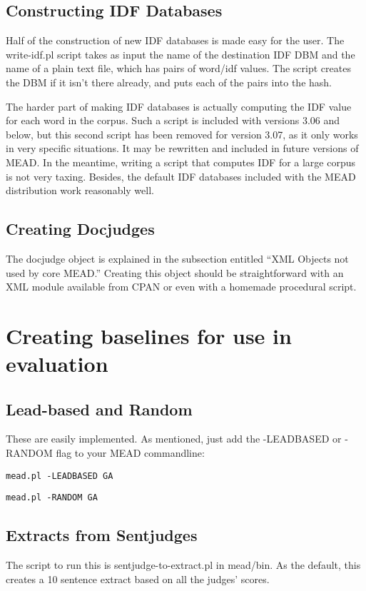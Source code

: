 \documentclass[10pt]{article}
\begin{document}
\subsection{Constructing IDF Databases}

Half of the construction of new IDF databases is made 
easy for the user.  The write-idf.pl script takes
as input the name of the destination IDF DBM and 
the name of a plain text file, which has pairs
of word/idf values.   The script creates the DBM
if it isn't there already, and puts each of the 
pairs into the hash.

The harder part of making IDF databases is actually
computing the IDF value for each word in the corpus.
Such a script is included with versions 3.06 and 
below, but this second script has been removed for
version 3.07, as it only works in very specific 
situations.  It may be rewritten and included in
future versions of MEAD.  In the meantime, writing
a script that computes IDF for a large corpus is
not very taxing.  Besides, the default IDF databases
included with the MEAD distribution work reasonably
well.

\subsection{Creating Docjudges}
The docjudge object is explained in the subsection entitled ``XML Objects not used by 
core MEAD.''  Creating this object should be straightforward with an XML module 
available from CPAN or even with a homemade procedural script.

\section{Creating baselines for use in evaluation}
\subsection{Lead-based and Random}
These are easily implemented.  As mentioned, just add the -LEADBASED 
or -RANDOM flag to your MEAD commandline:

{\tt mead.pl -LEADBASED GA}

{\tt mead.pl -RANDOM GA}

\subsection{Extracts from Sentjudges}

The script to run this is sentjudge-to-extract.pl in mead/bin.
As the default, this creates a 10 sentence extract based on all the judges' 
scores.  
\end{document}
